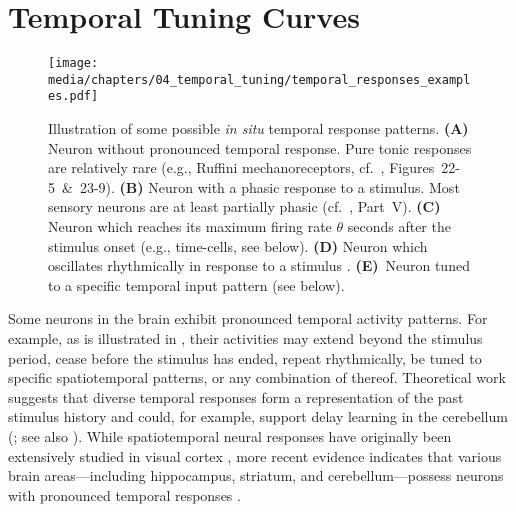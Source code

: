 
\section{Temporal Tuning Curves}
\label{sec:temporal_tuning_curves}

\begin{figure}
	\centering
	\texttt{[image: media/chapters/04\_temporal\_tuning/temporal\_responses\_examples.pdf]}%
	{\label{fig:temporal_responses_examples_a}}%
	{\label{fig:temporal_responses_examples_b}}%
	{\label{fig:temporal_responses_examples_c}}%
	{\label{fig:temporal_responses_examples_d}}%
	{\label{fig:temporal_responses_examples_e}}%
	\caption[Illustration of some possible in situ temporal response patterns]{Illustration of some possible \emph{in situ} temporal response patterns.
	\textbf{(A)} Neuron without pronounced temporal response.
	Pure tonic responses are relatively rare (e.g., Ruffini mechanoreceptors, cf.~\cite{kandel2012principles}, Figures~22-5~\&~23-9).
	\textbf{(B)} Neuron with a phasic response to a stimulus. Most sensory neurons are at least partially phasic (cf.~\cite{kandel2012principles}, Part~V).
	\textbf{(C)} Neuron which reaches its maximum firing rate $\theta$ seconds after the stimulus onset (e.g., time-cells, see below).
	\textbf{(D)} Neuron which oscillates rhythmically in response to a stimulus \citep[e.g.,][]{friedman-hill2000dynamics}.
	\textbf{(E)}~Neuron tuned to a specific temporal input pattern (see below).
	}
	\label{fig:temporal_responses_examples}
\end{figure}

Some neurons in the brain exhibit pronounced temporal activity patterns.
For example, as is illustrated in , their activities may extend beyond the stimulus period, cease before the stimulus has ended, repeat rhythmically, be tuned to specific spatiotemporal patterns, or any combination of thereof.
Theoretical work suggests that diverse temporal responses form a representation of the past stimulus history \citep{grossberg1989neural,howard2014unified,voelker2018improving} and could, for example, support delay learning in the cerebellum (\cite{fujita1982adaptive,medina2000computer}; see also ).
While spatiotemporal neural responses have originally been extensively studied in visual cortex \citep[e.g.,][]{deangelis1993spatiotemporal,carandini1999linearity}, more recent evidence indicates that various brain areas---including hippocampus, striatum, and cerebellum---possess neurons with pronounced temporal responses \citep[e.g.,][]{lusk2016cerebellar}.

